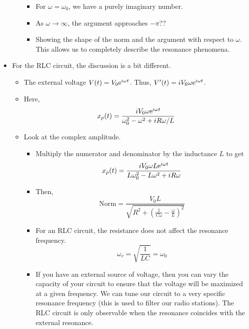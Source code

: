\documentclass[../notes.tex]{subfiles}
\begin{document}
\begin{itemize}
\begin{itemize}
\begin{itemize}
            \item For $\omega=\omega_0$, we have a purely imaginary number.
            \item As $\omega\to\infty$, the argument approaches $-\pi$??
            \item Showing the shape of the norm and the argument with respect to $\omega$. This allows us to completely describe the resonance phenomena.
        \end{itemize}
    \end{itemize}
    \item For the RLC circuit, the discussion is a bit different.
    \begin{itemize}
        \item The external voltage $V(t)=V_0\e[i\omega t]$. Thus, $V'(t)=iV_0\omega\e[i\omega t]$.
        \item Here,
        \begin{equation*}
            x_p(t) = \frac{iV_0\omega\e[i\omega t]}{\omega_0^2-\omega^2+iR\omega/L}
        \end{equation*}
        \item Look at the complex amplitude.
        \begin{itemize}
            \item Multiply the numerator and denominator by the inductance $L$ to get
            \begin{equation*}
                x_p(t) = \frac{iV_0\omega L\e[i\omega t]}{L\omega_0^2-L\omega^2+iR\omega}
            \end{equation*}
            \item Then,
            \begin{equation*}
                \text{Norm} = \frac{V_0L}{\sqrt{R^2+\left( \frac{1}{C\omega}-\frac{\omega}{L} \right)^2}}
            \end{equation*}
            \item For an RLC circuit, the resistance does not affect the resonance frequency.
            \begin{equation*}
                \omega_r = \sqrt{\frac{1}{LC}} = \omega_0
            \end{equation*}
            \item If you have an external source of voltage, then you can vary the capacity of your circuit to ensure that the voltage will be maximized at a given frequency. We can tune our circuit to a very specific resonance frequency (this is used to filter our radio stations). The RLC circuit is only observable when the resonance coincides with the external resonance.

\end{itemize}
\end{itemize}
\end{itemize}
\end{document}
